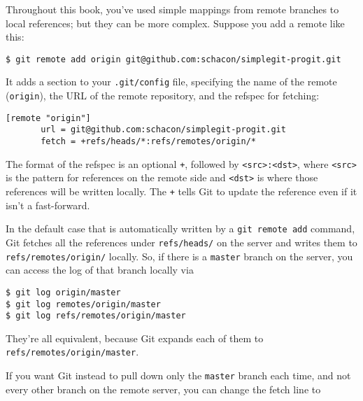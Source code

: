 \documentclass[a4paper]{book}
\begin{document}
Throughout this book, you've used simple mappings from remote branches to local references; but they can be more complex. Suppose you add a remote like this:

\begin{shaded}\begin{verbatim}
$ git remote add origin git@github.com:schacon/simplegit-progit.git
\end{verbatim}\end{shaded}

It adds a section to your \texttt{.git/config} file, specifying the name of the remote (\texttt{origin}), the URL of the remote repository, and the refspec for fetching:

\begin{shaded}\begin{verbatim}
[remote "origin"]
       url = git@github.com:schacon/simplegit-progit.git
       fetch = +refs/heads/*:refs/remotes/origin/*
\end{verbatim}\end{shaded}

The format of the refspec is an optional \texttt{+}, followed by \texttt{\textless{}src\textgreater{}:\textless{}dst\textgreater{}}, where \texttt{\textless{}src\textgreater{}} is the pattern for references on the remote side and \texttt{\textless{}dst\textgreater{}} is where those references will be written locally. The \texttt{+} tells Git to update the reference even if it isn't a fast-forward.

In the default case that is automatically written by a \texttt{git remote add} command, Git fetches all the references under \texttt{refs/heads/} on the server and writes them to \texttt{refs/remotes/origin/} locally. So, if there is a \texttt{master} branch on the server, you can access the log of that branch locally via

\begin{shaded}\begin{verbatim}
$ git log origin/master
$ git log remotes/origin/master
$ git log refs/remotes/origin/master
\end{verbatim}\end{shaded}

They're all equivalent, because Git expands each of them to \texttt{refs/remotes/origin/master}.

If you want Git instead to pull down only the \texttt{master} branch each time, and not every other branch on the remote server, you can change the fetch line to
\end{document}
